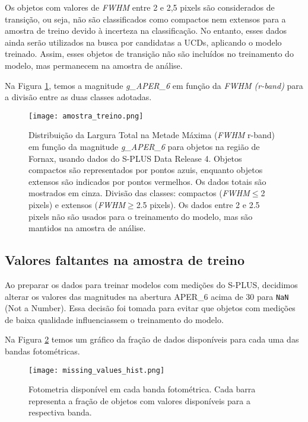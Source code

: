 Os objetos com valores de \textit{FWHM} entre 2 e 2,5 pixels são considerados de transição, ou seja, não são classificados como compactos nem extensos para a amostra de treino devido à incerteza na classificação. No entanto, esses dados ainda serão utilizados na busca por candidatas a UCDs, aplicando o modelo treinado. Assim, esses objetos de transição não são incluídos no treinamento do modelo, mas permanecem na amostra de análise.

Na Figura \ref{amostra_treino}, temos a magnitude \textit{g\_APER\_6} em função da \textit{FWHM (r-band)} para a divisão entre as duas classes adotadas.

\begin{figure}[!ht]
    \centering
    \texttt{[image: amostra\_treino.png]}
    \caption[]{Distribuição da Largura Total na Metade Máxima (\textit{FWHM} r-band) em função da magnitude \textit{g\_APER\_6} para objetos na região de Fornax, usando dados do S-PLUS Data Release 4. Objetos compactos são representados por pontos azuis, enquanto objetos extensos são indicados por pontos vermelhos. Os dados totais são mostrados em cinza. Divisão das classes: compactos (\textit{FWHM}$\leq$2 pixels) e extensos (\textit{FWHM}$\geq$2.5 pixels). Os dados entre 2 e 2.5 pixels não são usados para o treinamento do modelo, mas são mantidos na amostra de análise.}
    \label{amostra_treino}
\end{figure}

\subsection{Valores faltantes na amostra de treino}\label{subsec:valores_faltantes}
Ao preparar os dados para treinar modelos com medições do S-PLUS, decidimos alterar os valores das magnitudes na abertura APER\_6 acima de 30 para \texttt{NaN} (Not a Number). Essa decisão foi tomada para evitar que objetos com medições de baixa qualidade influenciassem o treinamento do modelo.

Na Figura \ref{missing_values_hist} temos um gráfico da fração de dados disponíveis para cada uma das bandas fotométricas.

\begin{figure}[!ht]
    \begin{center}
    \texttt{[image: missing\_values\_hist.png]}
    \caption[]{Fotometria disponível em cada banda fotométrica. Cada barra representa a fração de objetos com valores disponíveis para a respectiva banda.}
    \label{missing_values_hist}
    \end{center}
\end{figure}

